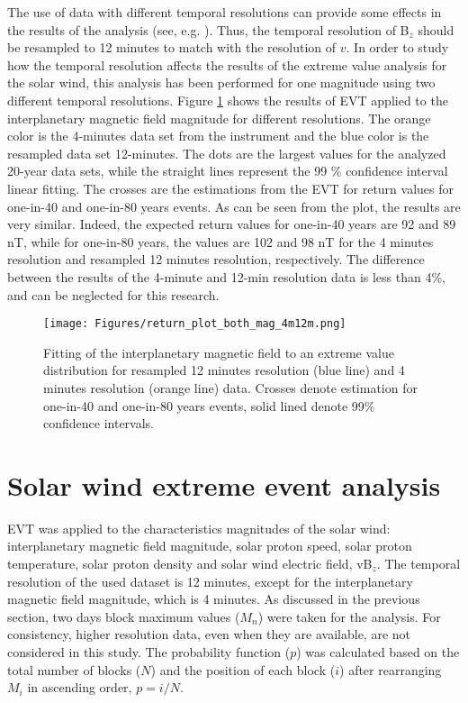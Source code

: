 \documentclass{article}
\begin{document}
The use of data with different temporal resolutions can provide some effects in the results of the analysis (see, e.g. \cite{Trichtchenko2021_GIC}). Thus, the temporal resolution of B$_{z}$ should be resampled to 12 minutes to match with the resolution of $v$. In order to study how the temporal resolution affects the results of the extreme value analysis for the solar wind, this analysis has been performed for one magnitude using two different temporal resolutions.
Figure \ref{fig:return_mag_both4m12m} shows the results of EVT applied to the interplanetary magnetic field magnitude for different resolutions. The orange color is the 4-minutes data set from the instrument and the blue color is the resampled data set 12-minutes. The dots are the largest values for the analyzed 20-year data sets, while the straight lines represent the 99 \% confidence interval linear fitting. The crosses are the estimations from the EVT for return values for one-in-40 and one-in-80 years events.
As can be seen from the plot, the results are very similar. Indeed, the expected return values for one-in-40 years are 92 and 89 nT, while for one-in-80 years, the values are 102 and 98 nT for the 4 minutes resolution and resampled 12 minutes resolution, respectively. The difference between the results of the 4-minute and 12-min resolution data is less than 4\%, and can be neglected for this research.

\begin{figure}[!htb]
	\texttt{[image: Figures/return\_plot\_both\_mag\_4m12m.png]}
    \caption{Fitting of the interplanetary magnetic field to an extreme value distribution for resampled 12 minutes resolution (blue line) and 4 minutes resolution (orange line) data. Crosses denote estimation for one-in-40 and one-in-80 years events, solid lined denote 99\% confidence intervals.}
    \label{fig:return_mag_both4m12m}
\end{figure}

\section{Solar wind extreme event analysis} \label{sec:solar_wind}

EVT was applied to the characteristics magnitudes of the solar wind: interplanetary magnetic field magnitude, solar proton speed, solar proton temperature, solar proton density and solar wind electric field, vB$_{z}$. The temporal resolution of the used dataset is 12 minutes, except for the interplanetary magnetic field magnitude, which is 4 minutes.
As discussed in the previous section, two days block maximum values ($M_{n}$) were taken for the analysis. For consistency, higher resolution data, even when they are available, are not considered in this study. The probability function ($p$) was calculated based on the total number of blocks ($N$) and the position of each block ($i$) after rearranging $M_{i}$ in ascending order, $p=i/N$.
\end{document}
